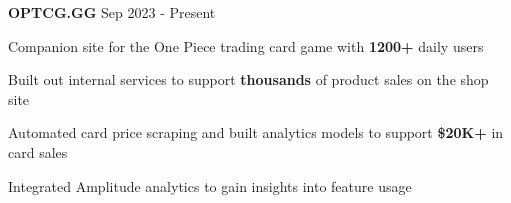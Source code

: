 



\begin{cventries}


\cventry
{\textbf{OPTCG.GG }\href{https://optcg.gg}{\faShareSquare}}
{Sep 2023 - Present} %
{ %
\begin{cvitems}
\item {Companion site for the One Piece trading card game with \textbf{1200+} daily users}
\item {Built out internal services to support \textbf{thousands} of product sales on the shop site}
\item {Automated card price scraping and built analytics models to support \textbf{\$20K+} in card sales}
\item {Integrated Amplitude analytics to gain insights into feature usage}
\end{cvitems}
}





\end{cventries}
